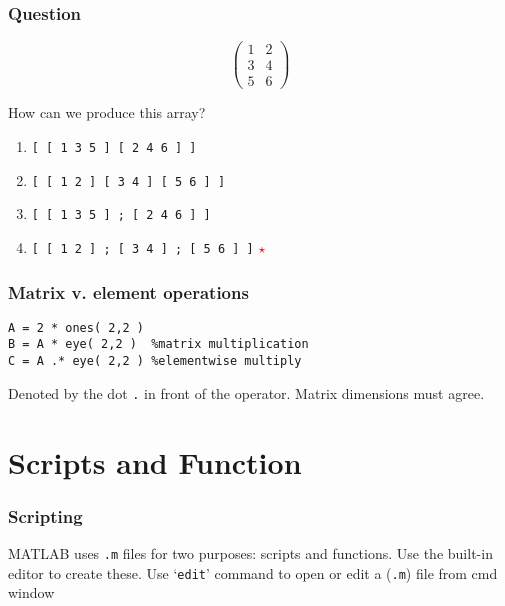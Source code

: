 \documentclass[11pt]{beamer}
\newcommand{\correctstar}{{\Large\textcolor{red}{$\star$}}}
\begin{document}
\begin{frame}[fragile]
  \frametitle{Question}
  \Enlarge
$$
\left(
\begin{array}{cc}
1 & 2 \\
3 & 4 \\
5 & 6
\end{array}
\right)
$$

How can we produce this array?

  \begin{enumerate}[label=\Alph*]
    \item  \texttt{[ [ 1 3 5 ] [ 2 4 6 ] ]}
    \item  \texttt{[ [ 1 2 ] [ 3 4 ] [ 5 6 ] ]}
    \item  \texttt{[ [ 1 3 5 ] ; [ 2 4 6 ] ]}
    \item  \texttt{[ [ 1 2 ] ; [ 3 4 ] ; [ 5 6 ] ]} \correctstar
  \end{enumerate}
\end{frame}

\begin{frame}[fragile]
  \frametitle{Matrix v. element operations}
  \Enlarge

  \begin{Verbatim}
A = 2 * ones( 2,2 )
B = A * eye( 2,2 )  %matrix multiplication  
C = A .* eye( 2,2 ) %elementwise multiply
  \end{Verbatim}
  \begin{enumerate}
  \myitem  Denoted by the dot \texttt{.} in front of the operator.
  \myitem  Matrix dimensions must agree. %
  \end{enumerate}
\end{frame}


\section{Scripts and Function}


\begin{frame}[fragile]
  \frametitle{Scripting}
  \Enlarge

  \begin{enumerate}
  \myitem  MATLAB uses \texttt{.m} files for two purposes:  scripts and functions.
  \myitem  Use the built-in editor to create these.
  \myitem Use `\texttt{edit}' command to open or edit a (\texttt{.m}) file from cmd window
  \end{enumerate}
\end{frame}
\end{document}
